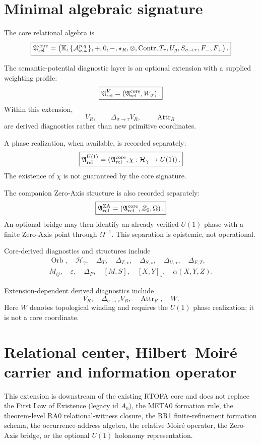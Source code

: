\documentclass[11pt]{article}
\newcommand{\Arel}{\mathfrak A_{\rm rel}}
\newcommand{\Zaxis}{\mathcal Z_{0}}
\begin{document}
\section{Minimal algebraic signature}

The core relational algebra is
\[
\boxed{
\Arel^{\rm core}=
\left(
\mathbb K,
\{\mathcal A_{\sigma,\omega}^{p,q}\},
+,
0,
-,
\star_R,
\otimes,
\operatorname{Contr},
T_r,
U_g,
S_{\sigma\to\tau},
F_{-},F_{+}
\right).
}
\]

The semantic-potential diagnostic layer is an optional extension with a
supplied weighting profile:
\[
\boxed{
\Arel^{V}
=
\left(
\Arel^{\rm core},
W_\sigma
\right).
}
\]
Within this extension,
\[
V_R,\qquad
\Delta_{\sigma\to\tau}V_R,\qquad
\operatorname{Attr}_R
\]
are derived diagnostics rather than new primitive coordinates.

A phase realization, when available, is recorded separately:
\[
\boxed{
\Arel^{U(1)}
=
\left(
\Arel^{\rm core},
\chi:\mathcal H_\gamma\to U(1)
\right).
}
\]
The existence of \(\chi\) is not guaranteed by the core signature.

The companion Zero-Axis structure is also recorded separately:
\[
\boxed{
\Arel^{\rm ZA}
=
\left(
\Arel^{\rm core},
\Zaxis,
\Omega
\right).
}
\]
An optional bridge may then identify an already verified \(U(1)\) phase with
a finite Zero-Axis point through \(\Omega^{-1}\). This separation is
epistemic, not operational.

Core-derived diagnostics and structures include
\[
\boxed{
\begin{gathered}
\operatorname{Orb},\quad
\mathcal H_{\gamma},\quad
\Delta_T,\quad
\Delta_{T,\star},\quad
\Delta_{S,\star},\quad
\Delta_{U,\star},\quad
\Delta_{F,T},\\
M_{ij},\quad
\varepsilon,\quad
\Delta_F,\quad
[M,S],\quad
[X,Y]_{\star},\quad
\alpha(X,Y,Z).
\end{gathered}
}
\]

Extension-dependent derived diagnostics include
\[
\boxed{
V_R,\quad
\Delta_{\sigma\to\tau}V_R,\quad
\operatorname{Attr}_R,\quad
W.
}
\]
Here \(W\) denotes topological winding and requires the \(U(1)\) phase
realization; it is not a core coordinate.

\section{Relational center, Hilbert--Moir\'e carrier and information operator}

This extension is downstream of the existing RTOFA core and does not replace
the First Law of Existence (legacy id \(A_0\)), the META0 formation rule, the
theorem-level RA0 relational-witness closure, the RR1 finite-refinement
formation schema, the occurrence-address algebra, the relative Moir\'e
operator, the Zero-Axis bridge, or the optional \(U(1)\) holonomy
representation.
\end{document}
